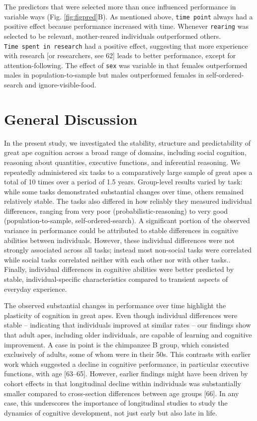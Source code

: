 \documentclass[
  man,floatsintext]{apa6}
\begin{document}
The predictors that were selected more than once influenced performance in variable ways (Fig. \ref{fig:figpred}B). As mentioned above, \texttt{time\ point} always had a positive effect because performance increased with time. Whenever \texttt{rearing} was selected to be relevant, mother-reared individuals outperformed others. \texttt{Time\ spent\ in\ research} had a positive effect, suggesting that more experience with research {[}or researchers, see 62{]} leads to better performance, except for attention-following. The effect of \texttt{sex} was variable in that females outperformed males in population-to-sample but males outperformed females in self-ordered-search and ignore-visible-food.

\section{General Discussion}\label{general-discussion}

In the present study, we investigated the stability, structure and predictability of great ape cognition across a broad range of domains, including social cognition, reasoning about quantities, executive functions, and inferential reasoning. We repeatedly administered six tasks to a comparatively large sample of great apes a total of 10 times over a period of 1.5 years. Group-level results varied by task: while some tasks demonstrated substantial changes over time, others remained relatively stable. The tasks also differed in how reliably they measured individual differences, ranging from very poor (probabilistic-reasoning) to very good (population-to-sample, self-ordered-search). A significant portion of the observed variance in performance could be attributed to stable differences in cognitive abilities between individuals. However, these individual differences were not strongly associated across all tasks; instead most non-social tasks were correlated while social tasks correlated neither with each other nor with other tasks.. Finally, individual differences in cognitive abilities were better predicted by stable, individual-specific characteristics compared to transient aspects of everyday experience.

The observed substantial changes in performance over time highlight the plasticity of cognition in great apes. Even though individual differences were stable -- indicating that individuals improved at similar rates -- our findings show that adult apes, including older individuals, are capable of learning and cognitive improvement. A case in point is the chimpanzee B group, which consisted exclusively of adults, some of whom were in their 50s. This contrasts with earlier work which suggested a decline in cognitive performance, in particular executive functions, with age {[}63--65{]}. However, earlier findings might have been driven by cohort effects in that longitudinal decline within individuals was substantially smaller compared to cross-section differences between age groups {[}66{]}. In any case, this underscores the importance of longitudinal studies to study the dynamics of cognitive development, not just early but also late in life.
\end{document}
